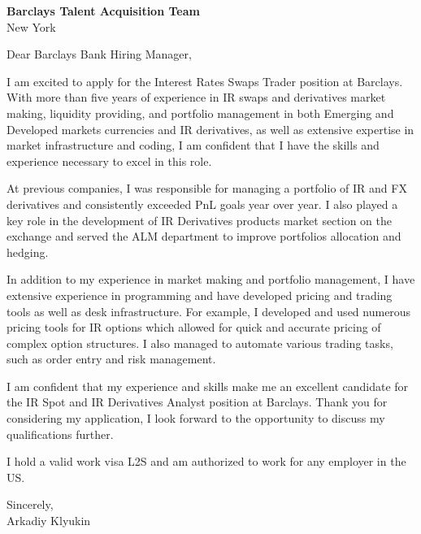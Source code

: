 \documentclass{letter}
\begin{document}
\begin{letter}{\textbf{Barclays Talent Acquisition Team} \\
                New York }


\opening{Dear Barclays Bank Hiring Manager,}

I am excited to apply for the Interest Rates Swaps Trader position at Barclays. With more than five years of experience in IR swaps and derivatives market making, liquidity providing, and portfolio management in both Emerging and Developed markets currencies and IR derivatives, as well as extensive expertise in market infrastructure and coding, I am confident that I have the skills and experience necessary to excel in this role.

At previous companies, I was responsible for managing a portfolio of IR and FX derivatives and consistently exceeded PnL goals year over year. I also played a key role in the development of IR Derivatives products market section on the exchange and served the ALM department to improve portfolios allocation and hedging.

In addition to my experience in market making and portfolio management, I have extensive experience in programming and have developed pricing and trading tools as well as desk infrastructure. For example, I developed and used numerous pricing tools for IR options which allowed for quick and accurate pricing of complex option structures. I also managed to automate various trading tasks, such as order entry and risk management.

I am confident that my experience and skills make me an excellent candidate for the IR Spot and IR Derivatives Analyst position at Barclays. Thank you for considering my application, I look forward to the opportunity to discuss my qualifications further.

I hold a valid work visa L2S and am authorized to work for any employer in the US.

Sincerely,\\
Arkadiy Klyukin
\end{letter}
\end{document}
